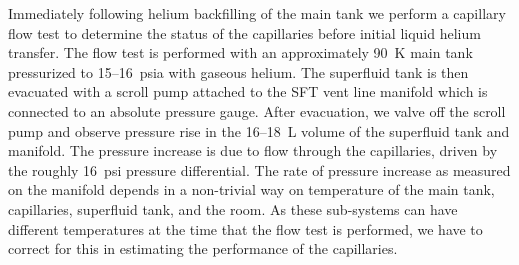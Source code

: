 \documentclass[
12pt, %
letterpaper, %
oneside, %
headinclude, footinclude, %
BCOR5mm, %
]{scrartcl}
\newcommand{\red}[1]{{\color{red} #1}}
\newcommand{\mrm}[1]{\mathrm{#1}}
\begin{document}
Immediately following helium backfilling of the main tank we perform a capillary flow test to determine the status of the capillaries before initial liquid helium transfer. The flow test is performed with an approximately 90~K main tank pressurized to 15--16~psia with gaseous helium. The superfluid tank is then evacuated with a scroll pump attached to the SFT vent line manifold which is connected to an absolute pressure gauge. After evacuation, we valve off the scroll pump and observe pressure rise in the 16--18~L volume of the superfluid tank and manifold. The pressure increase is due to flow through the capillaries, driven by the roughly 16~psi pressure differential. The rate of pressure increase as measured on the manifold depends in a non-trivial way on temperature of the main tank, capillaries, superfluid tank, and the room. As these sub-systems can have different temperatures at the time that the flow test is performed, we have to correct for this in estimating the performance of the capillaries. 




\end{document}
